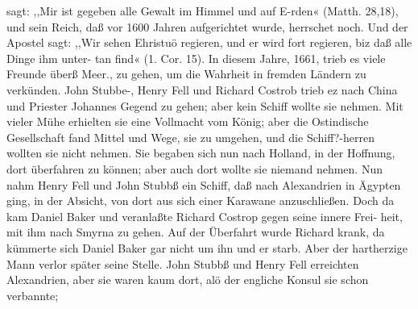 sagt: ,,Mir ist gegeben alle Gewalt im Himmel und auf E-rden«
(Matth. 28,18), und sein Reich, daß vor 1600 Jahren aufgerichtet
wurde, herrschet noch. Und der Apostel sagt: ,,Wir sehen Ehristuö
regieren, und er wird fort regieren, biz daß alle Dinge ihm unter-
tan find« (1. Cor. 15).
In diesem Jahre, 1661, trieb es viele Freunde überß Meer.,
zu gehen, um die Wahrheit in fremden Ländern zu verkünden.
John Stubbe-, Henry Fell und Richard Costrob trieb ez nach
China und Priester Johannes Gegend zu gehen; aber kein Schiff
wollte sie nehmen. Mit vieler Mühe erhielten sie eine Vollmacht
vom König; aber die Ostindische Gesellschaft fand Mittel und
Wege, sie zu umgehen, und die Schiff?-herren wollten sie nicht
nehmen. Sie begaben sich nun nach Holland, in der Hoffnung,
dort überfahren zu können; aber auch dort wollte sie niemand
nehmen. Nun nahm Henry Fell und John Stubbß ein Schiff,
daß nach Alexandrien in Ägypten ging, in der Absicht, von dort
aus sich einer Karawane anzuschließen. Doch da kam Daniel
Baker und veranlaßte Richard Costrop gegen seine innere Frei-
heit, mit ihm nach Smyrna zu gehen. Auf der Überfahrt wurde
Richard krank, da kümmerte sich Daniel Baker gar nicht um ihn
und er starb. Aber der hartherzige Mann verlor später seine Stelle.
John Stubbß und Henry Fell erreichten Alexandrien, aber
sie waren kaum dort, alö der engliche Konsul sie schon verbannte;



